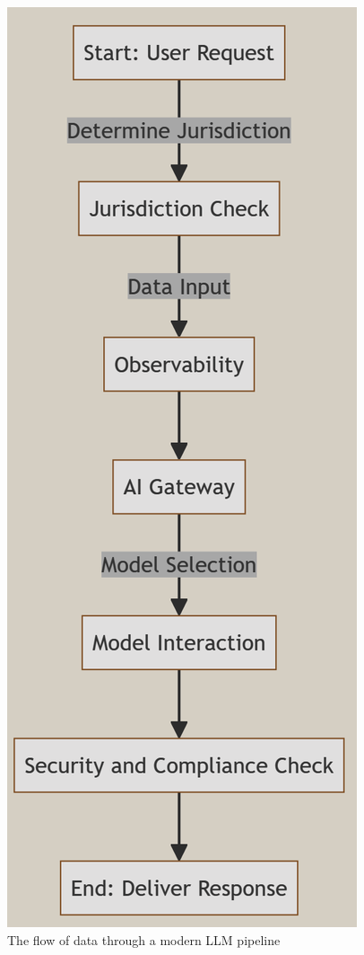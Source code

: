 \begin{figure}[htbp]
    \centering
    \includegraphics{llmflow}
    \caption{The flow of data through a modern LLM pipeline}
    \label{fig:llmflow}
\end{figure}



